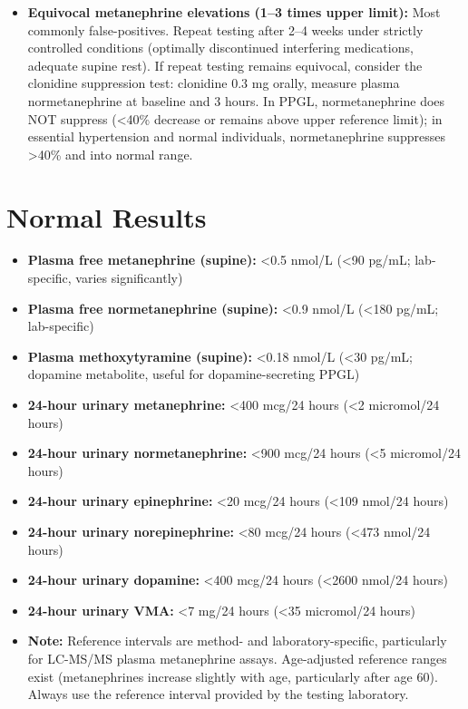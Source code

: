 \begin{itemize}
  \item \textbf{Equivocal metanephrine elevations (1--3 times upper limit):} Most commonly false-positives. Repeat testing after 2--4 weeks under strictly controlled conditions (optimally discontinued interfering medications, adequate supine rest). If repeat testing remains equivocal, consider the clonidine suppression test: clonidine 0.3 mg orally, measure plasma normetanephrine at baseline and 3 hours. In PPGL, normetanephrine does NOT suppress (<40\% decrease or remains above upper reference limit); in essential hypertension and normal individuals, normetanephrine suppresses >40\% and into normal range.
\end{itemize}

\section*{Normal Results}
\begin{itemize}
  \item \textbf{Plasma free metanephrine (supine):} <0.5 nmol/L (<90 pg/mL; lab-specific, varies significantly)
  \item \textbf{Plasma free normetanephrine (supine):} <0.9 nmol/L (<180 pg/mL; lab-specific)
  \item \textbf{Plasma methoxytyramine (supine):} <0.18 nmol/L (<30 pg/mL; dopamine metabolite, useful for dopamine-secreting PPGL)
  \item \textbf{24-hour urinary metanephrine:} <400 mcg/24 hours (<2 micromol/24 hours)
  \item \textbf{24-hour urinary normetanephrine:} <900 mcg/24 hours (<5 micromol/24 hours)
  \item \textbf{24-hour urinary epinephrine:} <20 mcg/24 hours (<109 nmol/24 hours)
  \item \textbf{24-hour urinary norepinephrine:} <80 mcg/24 hours (<473 nmol/24 hours)
  \item \textbf{24-hour urinary dopamine:} <400 mcg/24 hours (<2600 nmol/24 hours)
  \item \textbf{24-hour urinary VMA:} <7 mg/24 hours (<35 micromol/24 hours)
  \item \textbf{Note:} Reference intervals are method- and laboratory-specific, particularly for LC-MS/MS plasma metanephrine assays. Age-adjusted reference ranges exist (metanephrines increase slightly with age, particularly after age 60). Always use the reference interval provided by the testing laboratory.
\end{itemize}

